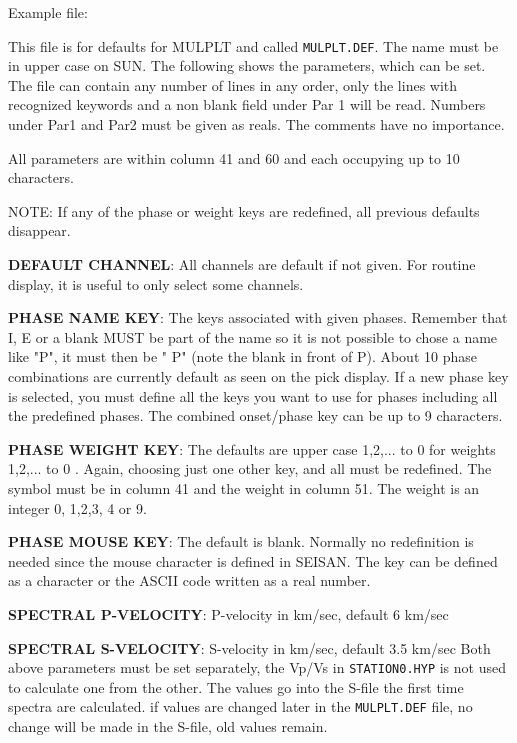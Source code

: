 Example file: 

This file is for defaults for MULPLT and called \texttt{MULPLT.DEF}. 
The name must be in upper case on SUN. The following shows the parameters, 
which can be set. The file can contain any number of lines in any order, 
only the lines with recognized keywords and a non blank field under 
Par 1 will be read. 
Numbers under Par1 and Par2 must be given as reals.
The comments have no importance. 

%


All parameters are within column 41 and 60 and each occupying up to 10 characters. 

NOTE: If any of the phase or weight keys are redefined, all previous defaults disappear. 

\textbf{DEFAULT CHANNEL}: All channels are default if not given. For routine display, it is useful to only select some channels. 

\textbf{PHASE NAME KEY}: The keys associated with given phases. Remember that I, E or a blank MUST be part of the name so it is not possible to chose a name like "P", it must then be " P" (note the blank in front of P). About 10 phase combinations are currently default as seen on the pick display. If a new phase key is selected, you must define all the keys you want to use for phases including all the predefined phases. The combined onset/phase key can be up to 9 characters. 

\textbf{PHASE WEIGHT KEY}: The defaults are upper 
case 1,2,... to 0 for weights 1,2,... to 0 . Again, choosing just one other 
key, and all must be redefined. The symbol must be in column 41 and the 
weight in column 51. The weight is an integer 0, 1,2,3, 4 or 9. 

\textbf{PHASE MOUSE KEY}: The default is blank. Normally no redefinition is needed since the mouse character is defined in SEISAN. The key can be defined as a character or the ASCII code written as a real number. 

\textbf{SPECTRAL P-VELOCITY}: P-velocity in km/sec, default 6 km/sec 

\textbf{SPECTRAL S-VELOCITY}: S-velocity in km/sec, default  3.5 km/sec Both above parameters must be set separately, the Vp/Vs in \texttt{STATION0.HYP} is not used to calculate one from the other. The values go into the S-file the first time spectra are calculated. if values are changed later in the \texttt{MULPLT.DEF} file, no change will be made in the S-file, old values remain. 

